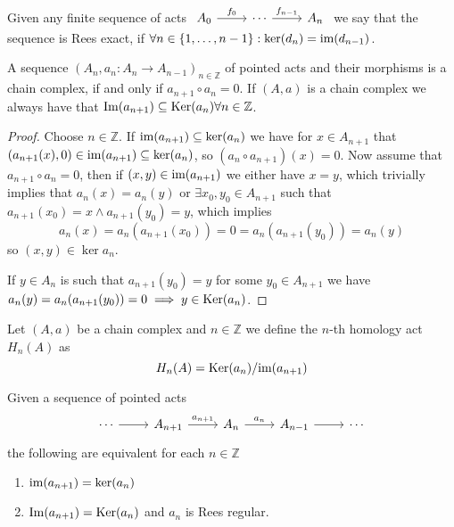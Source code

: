 Given any finite sequence of acts $\begin{tikzcd}
	{A_0} & \cdots & {A_n}
	\arrow["{f_0}", from=1-1, to=1-2]
	\arrow["{f_{n-1}}", from=1-2, to=1-3]
\end{tikzcd}$ we say that the sequence is Rees exact, if $\forall n\in\{1,\dots,n-1\} : \mathrm{ker}(d_n) = \text{im}(d_{n-1})$.
\begin{lemma} 
    A sequence $(A_n,a_{n} : A_n\to A_{n-1})_{n\in\mathbb{Z}}$ of pointed acts and their morphisms is a chain complex, if and only if $a_{n+1}\circ a_n = 0$. If $(A,a)$ is a chain complex 
    we always have that $\mathrm{Im}(a_{n+1})\subseteq\mathrm{Ker}(a_n) \forall n\in\mathbb{Z}$.
\end{lemma}
\begin{proof}[Proof]
    Choose $n\in\mathbb{Z}$. 
    If $\text{im}(a_{n+1})\subseteq\mathrm{ker}(a_n)$ we have for $x\in A_{n+1}$ that
    $(a_{n+1}(x),0)\in\text{im}(a_{n+1})\subseteq\mathrm{ker}(a_n)$, so $(a_n\circ a_{n+1})(x) = 0$. Now assume that $a_{n+1}\circ a_n = 0$, then 
    if $(x,y)\in\text{im}(a_{n+1})$ we either have $x=y$, which trivially implies that $a_n(x)=a_n(y)$ or 
    $\exists x_0,y_0\in A_{n+1}$ such that $a_{n+1}(x_0)=x\land a_{n+1}(y_0)=y$, which implies 
    \[
        a_n(x) = a_n(a_{n+1}(x_0)) = 0 = a_n(a_{n+1}(y_0)) = a_n(y)
    \]
    so $(x,y)\in\ker{a_n}$.\par
    If $y\in A_n$ is such that $a_{n+1}(y_0)=y$ for some $y_0\in A_{n+1}$ we 
    have $a_n(y) = a_n(a_{n+1}(y_0)) = 0 \implies y\in\mathrm{Ker}(a_n)$.
\end{proof}
\begin{definition}
    Let $(A,a)$ be a chain complex and $n\in\mathbb{Z}$ we define the $n$-th homology act $H_n(A)$ as 
    \[
        H_n(A) = \mathrm{Ker}(a_n)/\text{im}(a_{n+1})
    \]
\end{definition}
\begin{proposition}\label{regularityProp}
    Given a sequence of pointed acts 
    \[\begin{tikzcd}
        \cdots & {A_{n+1}} & {A_n} & {A_{n-1}} & \cdots
        \arrow[from=1-1, to=1-2]
        \arrow["{a_{n+1}}", from=1-2, to=1-3]
        \arrow["{a_n}", from=1-3, to=1-4]
        \arrow[from=1-4, to=1-5]
    \end{tikzcd}\]
    the following are equivalent for each $n\in\mathbb{Z}$
    \begin{enumerate}
        \item $\text{im}(a_{n+1})=\mathrm{ker}(a_n)$
        \item $\mathrm{Im}(a_{n+1})=\mathrm{Ker}(a_n)$ and $a_n$ is Rees regular.
    \end{enumerate}
\end{proposition}
